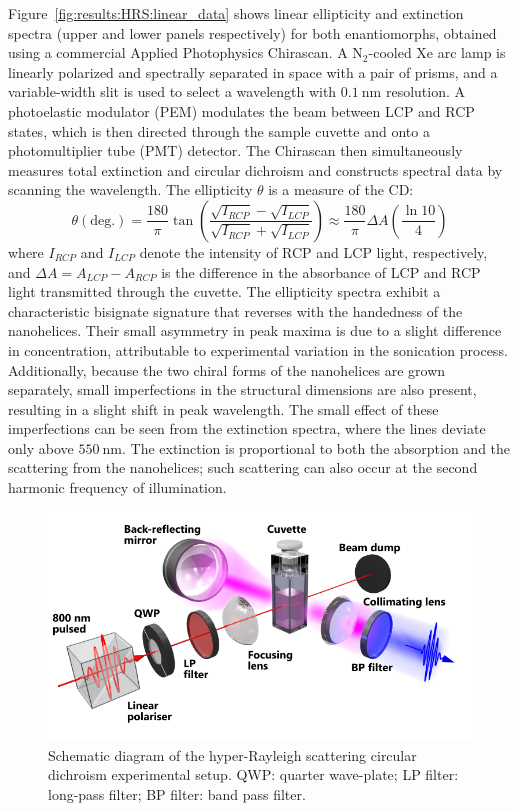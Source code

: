 Figure~\ref{fig:results:HRS:linear_data} shows linear ellipticity and extinction spectra (upper and lower panels respectively) for both enantiomorphs, obtained using a commercial Applied Photophysics Chirascan. A $\text{N}_2$-cooled Xe arc lamp is linearly polarized and spectrally separated in space with a pair of prisms, and a variable-width slit is used to select a wavelength with $\SI{0.1}{\nano\m}$ resolution. A photoelastic modulator (PEM) modulates the beam between LCP and RCP states, which is then directed through the sample cuvette and onto a photomultiplier tube (PMT) detector. The Chirascan then simultaneously measures total extinction and circular dichroism and constructs spectral data by scanning the wavelength.
The ellipticity $\theta$ is a measure of the CD:
\begin{equation}
    \theta (\text{deg.}) = \frac{180}{\pi} \tan\left( \frac{\sqrt{I_{RCP}} - \sqrt{I_{LCP}}}{\sqrt{I_{RCP}} + \sqrt{I_{LCP}}} \right) \approx \frac{180}{\pi} \Delta A \left( \frac{\ln 10}{4} \right)
\end{equation}
where $I_{RCP}$ and $I_{LCP}$ denote the intensity of RCP and LCP light, respectively, and $\Delta A = A_{LCP} - A_{RCP}$ is the difference in the absorbance of LCP and RCP light transmitted through the cuvette. 
The ellipticity spectra exhibit a characteristic bisignate signature that reverses with the handedness of the nanohelices. Their small asymmetry in peak maxima is due to a slight difference in concentration, attributable to experimental variation in the sonication process. Additionally, because the two chiral forms of the nanohelices are grown separately, small imperfections in the structural dimensions are also present, resulting in a slight shift in peak wavelength. The small effect of these imperfections can be seen from the extinction spectra, where the lines deviate only above $\SI{550}{\nano\m}$. The extinction is proportional to both the absorption and the scattering from the nanohelices; such scattering can also occur at the second harmonic frequency of illumination. 

\begin{figure}[htb!]	
    \centering	
    \includegraphics[scale=1]{./figures/results/HRS/experiment_schematic.pdf}
    \caption{\label{fig:results:HRS:experiment_schematic}
    Schematic diagram of the hyper-Rayleigh scattering circular dichroism experimental setup. QWP: quarter wave-plate; LP filter: long-pass filter; BP filter: band pass filter. }	
\end{figure}

